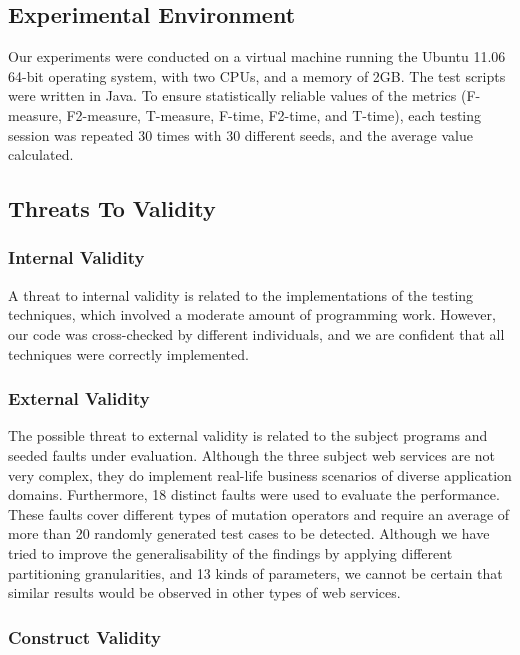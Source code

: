 \documentclass[10pt,journal,compsoc]{IEEEtran}
\begin{document}
\subsection{Experimental Environment}
\label{sec:environment}

Our experiments were conducted on a virtual machine running the Ubuntu 11.06 64-bit operating system, with two CPUs, and a memory of 2GB.
The test scripts were written in Java.
To ensure statistically reliable values \cite{arcuri2011practical} of the metrics (F-measure, F2-measure, T-measure, F-time, F2-time, and T-time), each testing session was repeated 30 times with 30 different seeds, and the average value calculated.

\subsection{Threats To Validity}
\label{sec:threats}

\subsubsection{Internal Validity}
\label{sec:internalthreats}

A threat to internal validity is related to the implementations of the testing techniques, which involved a moderate amount of programming work.
However, our code was cross-checked by different individuals, and we are confident that all techniques were correctly implemented.

\subsubsection{External Validity}
\label{sec:externalthreats}

The possible threat to external validity is related to the subject programs and seeded faults under evaluation.
Although the three subject web services are not very complex, they do implement real-life business scenarios of diverse application domains.
Furthermore, 18 distinct faults were used to evaluate the performance.
These faults cover different types of mutation operators and require an average of more than 20 randomly generated test cases to be detected.
Although we have tried to improve the generalisability of the findings by applying different partitioning granularities, and 13 kinds of parameters, we cannot be certain that similar results would be observed in other types of web services.

\subsubsection{Construct Validity}
\label{sec:construct}
\end{document}
